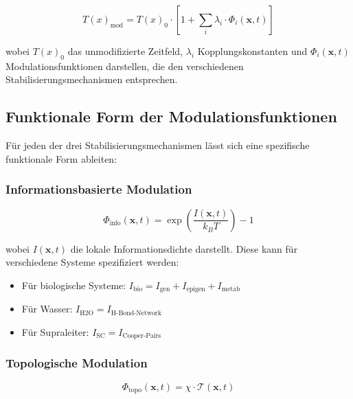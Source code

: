 \documentclass[12pt,a4paper]{article}
\newcommand{\Tfield}{T(x)}
\begin{document}
	\begin{equation}
		\Tfield_{\text{mod}} = \Tfield_0 \cdot \left[ 1 + \sum_i \lambda_i \cdot \Phi_i(\mathbf{x}, t) \right]
	\end{equation}
	
	wobei $\Tfield_0$ das unmodifizierte Zeitfeld, $\lambda_i$ Kopplungskonstanten und $\Phi_i(\mathbf{x}, t)$ Modulationsfunktionen darstellen, die den verschiedenen Stabilisierungs\-mechanismen entsprechen.
	
	\subsection{Funktionale Form der Modulationsfunktionen}
	\label{subsec:modulationsfunktionen}
	
	Für jeden der drei Stabilisierungs\-mechanismen lässt sich eine spezifische funktionale Form ableiten:
	
	\subsubsection{Informationsbasierte Modulation}
	\label{subsubsec:info_modulation}
	
	\begin{equation}
		\Phi_{\text{info}}(\mathbf{x}, t) = \exp\left(\frac{I(\mathbf{x}, t)}{k_B T}\right) - 1
	\end{equation}
	
	wobei $I(\mathbf{x}, t)$ die lokale Informationsdichte darstellt. Diese kann für verschiedene Systeme spezifiziert werden:
	
	\begin{itemize}
		\item Für biologische Systeme: $I_{\text{bio}} = I_{\text{gen}} + I_{\text{epigen}} + I_{\text{metab}}$
		\item Für Wasser: $I_{\text{H2O}} = I_{\text{H-Bond-Network}}$
		\item Für Supraleiter: $I_{\text{SC}} = I_{\text{Cooper-Pairs}}$
	\end{itemize}
	
	\subsubsection{Topologische Modulation}
	\label{subsubsec:topo_modulation}
	
	\begin{equation}
		\Phi_{\text{topo}}(\mathbf{x}, t) = \chi \cdot \mathcal{T}(\mathbf{x}, t)
	\end{equation}
	
\end{document}
